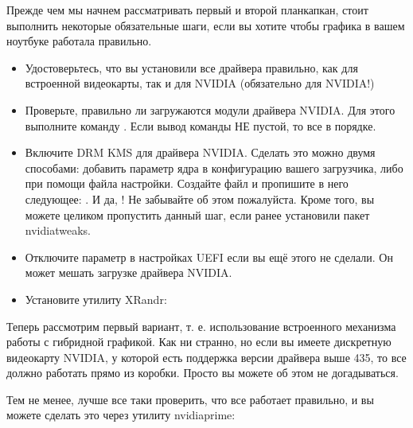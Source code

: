 \documentclass[letterpaper,10pt,russian,openany]{sphinxmanual}
\begin{document}
\sphinxAtStartPar
Прежде чем мы начнем рассматривать первый и второй план\sphinxhyphen{}капкан, стоит выполнить некоторые обязательные
шаги, если вы хотите чтобы графика в вашем ноутбуке работала правильно.
\begin{itemize}
\item {} 
\sphinxAtStartPar
Удостоверьтесь, что вы установили все драйвера правильно, как для встроенной видеокарты, так
и для NVIDIA (обязательно для NVIDIA!)

\item {} 
\sphinxAtStartPar
Проверьте, правильно ли загружаются модули драйвера NVIDIA. Для этого выполните команду .
Если вывод команды НЕ пустой, то все в порядке.

\item {} 
\sphinxAtStartPar
Включите DRM KMS для драйвера NVIDIA. Сделать это можно двумя способами: добавить параметр ядра 
в конфигурацию вашего загрузчика, либо при помощи файла настройки. Создайте файл  и пропишите
в него следующее: . И да, ! Не забывайте об этом пожалуйста. Кроме того, вы можете целиком пропустить данный шаг, если ранее установили
пакет nvidia\sphinxhyphen{}tweaks.

\item {} 
\sphinxAtStartPar
Отключите параметр  в настройках UEFI если вы ещё этого не сделали. Он может мешать загрузке драйвера NVIDIA.

\item {} 
\sphinxAtStartPar
Установите утилиту XRandr: 

\end{itemize}

\sphinxAtStartPar
Теперь рассмотрим первый вариант, т. е. использование встроенного механизма работы с гибридной графикой.
Как ни странно, но если вы имеете дискретную видеокарту NVIDIA, у которой есть поддержка версии драйвера
выше 435, то все должно работать прямо из коробки. Просто вы можете об этом не догадываться.

\sphinxAtStartPar
Тем не менее, лучше все таки проверить, что все работает правильно, и вы можете сделать
это через утилиту nvidia\sphinxhyphen{}prime:
\end{document}
